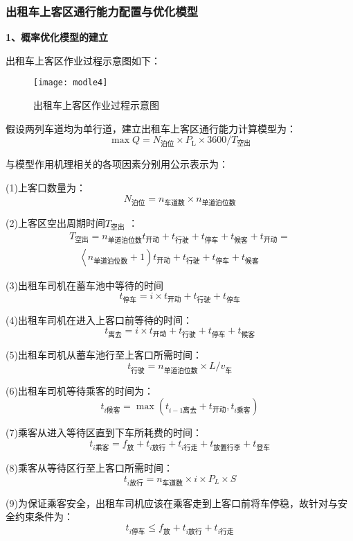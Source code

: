 \documentclass[withoutpreface,bwprint]{cumcmthesis} %
\begin{document}
\subsubsection{出租车上客区通行能力配置与优化模型}
\textbf{1、概率优化模型的建立}

出租车上客区作业过程示意图如下：
\begin{figure}[!htbp]
	\centering
	\texttt{[image: modle4]}
	\caption{出租车上客区作业过程示意图}
	\label{fig:circuit-diagram}
\end{figure}

假设两列车道均为单行道，建立出租车上客区通行能力计算模型为：
$$
\max Q=N_{\text {泊位}} \times P_{\mathrm{L}} \times 3600 / T_{\text {空出}}
$$

与模型作用机理相关的各项因素分别用公示表示为：

(1)上客口数量为：
$$
N_{\text{泊位}}=n_{\text{车道数}} \times n_{\text{单道泊位数}}
$$

(2)上客区空出周期时间$T_{\text{空出}}$ ：
$$
\begin{array}{l}{T_{\text{空出}}=n_{\text{单道泊位数}} t_{\text{开动}}+t_{\text{行驶}}+t_{\text{停车}}+t_{\text{候客}}+t_{\text{开动}}=} \\ {\quad\left\langle n_{\text{单道泊位数}}+1\right) t_{\text{开动}}+t_{\text{行驶}}+t_{\text{停车}}+t_{\text{候客}}}\end{array}
$$

(3)出租车司机在蓄车池中等待的时间
$$
t_{\text{停车}}=i \times t_{\text{开动}}+t_{\text{行驶}}+t_{\text{停车}}
$$

(4)出租车司机在进入上客口前等待的时间：
$$
t_{\text{离去}}=i \times t_{\text{开动}}+t_{\text{行驶}}+t_{\text{停车}}+t_{\text{候客}}
$$

(5)出租车司机从蓄车池行至上客口所需时间：
$$
t_{\text{行驶}}=n_{\text{单道泊位数}} \times L / v_{\text{车}}
$$

(6)出租车司机等待乘客的时间为：
$$
t_{i \text{候客}}=\max \left(t_{i-1 \text{离去}}+t_{\text{开动}}, t_{i \text{乘客}}\right)
$$

(7)乘客从进入等待区直到下车所耗费的时间：
$$
t_{i {\text{乘客}}}=f_{\text{放}}+t_{i {\text{放行}}}+t_{i {\text{行走}}}+t_{\text{放置行李}}+t_{\text{登车}}
$$

(8)乘客从等待区行至上客口所需时间：
$$
t_{i \text{放行}}=n_{\text{车道数}} \times i \times P_{L} \times S
$$

(9)为保证乘客安全，出租车司机应该在乘客走到上客口前将车停稳，故针对与安全约束条件为：
$$
t_{i \text{停车}} \leq f_{\text{放}}+t_{i \text{放行}}+t_{i \text{行走}}
$$
\end{document}
